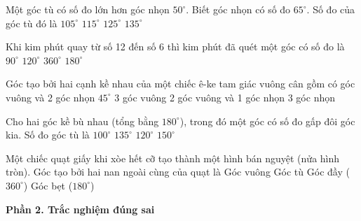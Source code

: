 \begin{ex} %
Một góc tù có số đo lớn hơn góc nhọn $50^\circ$. Biết góc nhọn có số đo $65^\circ$. Số đo của góc tù đó là
\choice
{$105^\circ$}
{\True $115^\circ$}
{$125^\circ$}
{$135^\circ$}
\end{ex}

\begin{ex} %
Khi kim phút quay từ số 12 đến số 6 thì kim phút đã quét một góc có số đo là
\choice
{$90^\circ$}
{$120^\circ$}
{$360^\circ$}
{\True $180^\circ$}
\end{ex}

\begin{ex} %
Góc tạo bởi hai cạnh kề nhau của một chiếc ê-ke tam giác vuông cân gồm có
\choice
{ góc vuông và 2 góc nhọn $45^\circ$}
{3 góc vuông}
{2 góc vuông và 1 góc nhọn}
{3 góc nhọn}
\end{ex}

\begin{ex} %
Cho hai góc kề bù nhau (tổng bằng $180^\circ$), trong đó một góc có số đo gấp đôi góc kia. Số đo góc tù là
\choice
{$100^\circ$}
{$135^\circ$}
{\True $120^\circ$}
{$150^\circ$}
\end{ex}

\begin{ex} %
Một chiếc quạt giấy khi xòe hết cỡ tạo thành một hình bán nguyệt (nửa hình tròn). Góc tạo bởi hai nan ngoài cùng của quạt là
\choice
{Góc vuông}
{Góc tù}
{Góc đầy ($360^\circ$)}
{\True Góc bẹt ($180^\circ$)}
\end{ex}

\textbf{Phần 2. Trắc nghiệm đúng sai}

